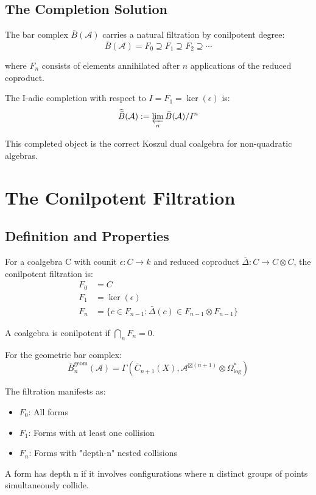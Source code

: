 \subsection{The Completion Solution}

\begin{idea}\label{idea:I-adic}
The bar complex $\bar{B}(\mathcal{A})$ carries a natural filtration by conilpotent degree:
$$\bar{B}(\mathcal{A}) = F_0 \supseteq F_1 \supseteq F_2 \supseteq \cdots$$

where $F_n$ consists of elements annihilated after $n$ applications of the reduced coproduct.

The I-adic completion with respect to $I = F_1 = \ker(\epsilon)$ is:
$$\widehat{\bar{B}}(\mathcal{A}) := \varprojlim_n \bar{B}(\mathcal{A})/I^n$$

This completed object is the correct Koszul dual coalgebra for non-quadratic algebras.
\end{idea}

\section{The Conilpotent Filtration}

\subsection{Definition and Properties}

\begin{definition}\label{def:conilpotent-filtration}
For a coalgebra C with counit $\epsilon: C \to k$ and reduced coproduct $\bar{\Delta}: C \to C \otimes C$, the conilpotent filtration is:
\begin{align*}
F_0 &= C \\
F_1 &= \ker(\epsilon) \\
F_n &= \{c \in F_{n-1} : \bar{\Delta}(c) \in F_{n-1} \otimes F_{n-1}\}
\end{align*}

A coalgebra is conilpotent if $\bigcap_n F_n = 0$.
\end{definition}

\begin{proposition}\label{prop:geom-conilpotent}
For the geometric bar complex:
$$\bar{B}^{\text{geom}}_n(\mathcal{A}) = \Gamma(\overline{C}_{n+1}(X), \mathcal{A}^{\boxtimes(n+1)} \otimes \Omega^*_{\log})$$

The filtration manifests as:
\begin{itemize}
\item $F_0$: All forms
\item $F_1$: Forms with at least one collision
\item $F_n$: Forms with "depth-n" nested collisions
\end{itemize}

A form has depth n if it involves configurations where n distinct groups of points simultaneously collide.
\end{proposition}

